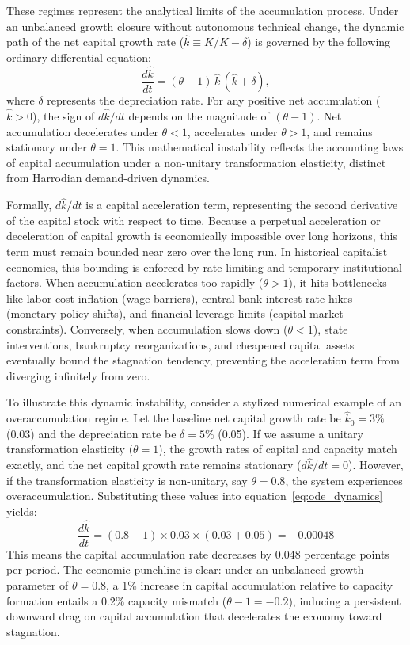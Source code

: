 \documentclass[11pt]{article}
\begin{document}
These regimes represent the analytical limits of the accumulation process. Under an unbalanced growth closure without autonomous technical change, the dynamic path of the net capital growth rate ($\hat{k} \equiv \dot{K}/K - \delta$) is governed by the following ordinary differential equation:
\begin{equation}
\label{eq:ode_dynamics}
\frac{d\hat{k}}{dt} = (\theta - 1)\,\hat{k}\,(\hat{k}+\delta),
\end{equation}
where $\delta$ represents the depreciation rate. For any positive net accumulation ($\hat{k} > 0$), the sign of $d\hat{k}/dt$ depends on the magnitude of $(\theta - 1)$. Net accumulation decelerates under $\theta < 1$, accelerates under $\theta > 1$, and remains stationary under $\theta = 1$. This mathematical instability reflects the accounting laws of capital accumulation under a non-unitary transformation elasticity, distinct from Harrodian demand-driven dynamics.

Formally, $d\hat{k}/dt$ is a capital acceleration term, representing the second derivative of the capital stock with respect to time. Because a perpetual acceleration or deceleration of capital growth is economically impossible over long horizons, this term must remain bounded near zero over the long run. In historical capitalist economies, this bounding is enforced by rate-limiting and temporary institutional factors. When accumulation accelerates too rapidly ($\theta > 1$), it hits bottlenecks like labor cost inflation (wage barriers), central bank interest rate hikes (monetary policy shifts), and financial leverage limits (capital market constraints). Conversely, when accumulation slows down ($\theta < 1$), state interventions, bankruptcy reorganizations, and cheapened capital assets eventually bound the stagnation tendency, preventing the acceleration term from diverging infinitely from zero.

To illustrate this dynamic instability, consider a stylized numerical example of an overaccumulation regime. Let the baseline net capital growth rate be $\hat{k}_0 = 3\%$ (0.03) and the depreciation rate be $\delta = 5\%$ (0.05). If we assume a unitary transformation elasticity ($\theta = 1$), the growth rates of capital and capacity match exactly, and the net capital growth rate remains stationary ($d\hat{k}/dt = 0$). However, if the transformation elasticity is non-unitary, say $\theta = 0.8$, the system experiences overaccumulation. Substituting these values into equation~\eqref{eq:ode_dynamics} yields:
\[\frac{d\hat{k}}{dt} = (0.8 - 1) \times 0.03 \times (0.03 + 0.05) = -0.00048\]
This means the capital accumulation rate decreases by 0.048 percentage points per period. The economic punchline is clear: under an unbalanced growth parameter of $\theta = 0.8$, a 1\% increase in capital accumulation relative to capacity formation entails a 0.2\% capacity mismatch ($\theta - 1 = -0.2$), inducing a persistent downward drag on capital accumulation that decelerates the economy toward stagnation.
\end{document}
